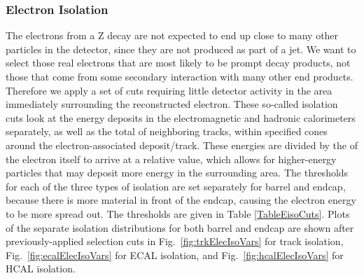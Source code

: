 \subsubsection{Electron Isolation}
\label{evSel:isol}
The electrons from a Z decay are not expected to end up 
close to many other particles in the detector, 
since they are not produced as part of a jet.  
We want to select those real electrons that are most likely to be prompt decay products,
not those that come from some secondary interaction with many other end products.  
Therefore we apply a set of cuts requiring little detector activity 
in the area immediately surrounding the reconstructed electron.  
These so-called isolation cuts look at the energy deposits 
in the electromagnetic and hadronic calorimeters separately,
as well as the total \pt of neighboring tracks, 
within specified \DR cones around the electron-associated deposit/track.  
These energies are divided by the \pt of the electron itself to arrive at a relative value,
which allows for higher-energy particles that may deposit more energy in the surrounding area.  
The thresholds for each of the three types of isolation are set separately for barrel and endcap, 
because there is more material in front of the endcap, 
causing the electron energy to be more spread out.  
The thresholds are given in Table \ref{TableEisoCuts}.  
Plots of the separate isolation distributions for both barrel and endcap 
are shown after previously-applied selection cuts in 
Fig.~\ref{fig:trkElecIsoVars} for track isolation, 
Fig.~\ref{fig:ecalElecIsoVars} for ECAL isolation, and 
Fig.~\ref{fig:hcalElecIsoVars} for HCAL isolation.  




